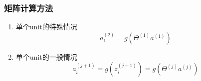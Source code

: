 \subsubsection{矩阵计算方法}
\begin{enumerate}
\item 单个unit的特殊情况
\begin{equation}
	a_1^{(2)} = g(\Theta^{(1)} a^{(1)})
\end{equation}

\item 单个unit的一般情况
\begin{equation}
	a_i^{(j+1)} = g(z_i^{(j+1)}) = g(\Theta^{(j)} a^{(j)})
\end{equation}


\end{enumerate}







